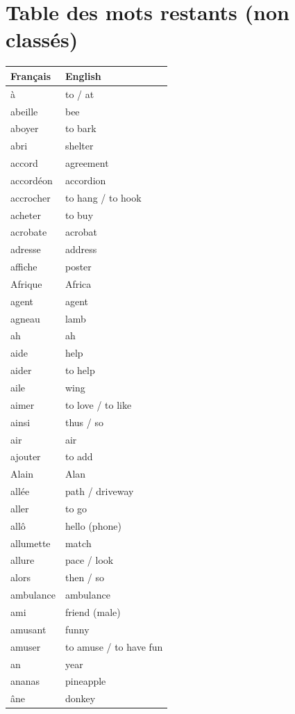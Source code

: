 \documentclass[12pt,a4paper]{article}
\begin{document}
\section*{Table des mots restants (non classés)}
\vspace{0.5cm}

\begin{longtable}{p{4cm} p{6cm}}
\toprule
\textbf{Français} & \textbf{English} \\
\midrule
à & to / at \\
abeille & bee \\
aboyer & to bark \\
abri & shelter \\
accord & agreement \\
accordéon & accordion \\
accrocher & to hang / to hook \\
acheter & to buy \\
acrobate & acrobat \\
adresse & address \\
affiche & poster \\
Afrique & Africa \\
agent & agent \\
agneau & lamb \\
ah & ah \\
aide & help \\
aider & to help \\
aile & wing \\
aimer & to love / to like \\
ainsi & thus / so \\
air & air \\
ajouter & to add \\
Alain & Alan \\
allée & path / driveway \\
aller & to go \\
allô & hello (phone) \\
allumette & match \\
allure & pace / look \\
alors & then / so \\
ambulance & ambulance \\
ami & friend (male) \\
amusant & funny \\
amuser & to amuse / to have fun \\
an & year \\
ananas & pineapple \\
âne & donkey \\

\end{longtable}
\end{document}
